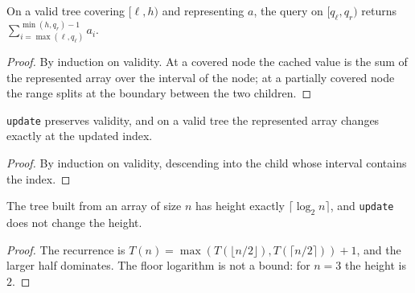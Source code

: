 \begin{theorem}
  \label{thm:segment-tree-query}
  \leanok
  On a valid tree covering $[\ell, h)$ and representing $a$, the query on $[q_\ell, q_r)$
  returns $\sum_{i = \max(\ell, q_\ell)}^{\min(h, q_r) - 1} a_i$.
\end{theorem}
\begin{proof}
  \leanok
  By induction on validity. At a covered node the cached value is the sum of the represented
  array over the interval of the node; at a partially covered node the range splits at the
  boundary between the two children.
\end{proof}

\begin{theorem}
  \label{thm:segment-tree-update}
  \leanok
  \texttt{update} preserves validity, and on a valid tree the represented array changes
  exactly at the updated index.
\end{theorem}
\begin{proof}
  \leanok
  By induction on validity, descending into the child whose interval contains the index.
\end{proof}

\begin{theorem}
  \label{thm:segment-tree-height}
  \leanok
  The tree built from an array of size $n$ has height exactly $\lceil \log_2 n \rceil$, and
  \texttt{update} does not change the height.
\end{theorem}
\begin{proof}
  \leanok
  The recurrence is $T(n) = \max(T(\lfloor n/2 \rfloor), T(\lceil n/2 \rceil)) + 1$, and
  the larger half dominates. The floor logarithm is not a bound: for $n = 3$ the height is
  $2$.
\end{proof}

